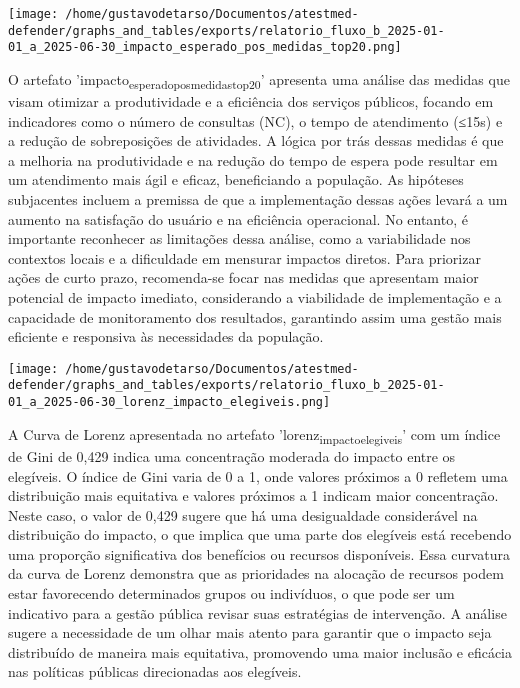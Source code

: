 \documentclass[11pt]{article}
\begin{document}
\begin{center}
\texttt{[image: /home/gustavodetarso/Documentos/atestmed-defender/graphs\_and\_tables/exports/relatorio\_fluxo\_b\_2025-01-01\_a\_2025-06-30\_impacto\_esperado\_pos\_medidas\_top20.png]}
\end{center}
O artefato 'impacto\textsubscript{esperado}\textsubscript{pos}\textsubscript{medidas}\textsubscript{top20}' apresenta uma análise das medidas que visam otimizar a produtividade e a eficiência dos serviços públicos, focando em indicadores como o número de consultas (NC), o tempo de atendimento (≤15s) e a redução de sobreposições de atividades. A lógica por trás dessas medidas é que a melhoria na produtividade e na redução do tempo de espera pode resultar em um atendimento mais ágil e eficaz, beneficiando a população. As hipóteses subjacentes incluem a premissa de que a implementação dessas ações levará a um aumento na satisfação do usuário e na eficiência operacional. No entanto, é importante reconhecer as limitações dessa análise, como a variabilidade nos contextos locais e a dificuldade em mensurar impactos diretos. Para priorizar ações de curto prazo, recomenda-se focar nas medidas que apresentam maior potencial de impacto imediato, considerando a viabilidade de implementação e a capacidade de monitoramento dos resultados, garantindo assim uma gestão mais eficiente e responsiva às necessidades da população.
\begin{center}
\texttt{[image: /home/gustavodetarso/Documentos/atestmed-defender/graphs\_and\_tables/exports/relatorio\_fluxo\_b\_2025-01-01\_a\_2025-06-30\_lorenz\_impacto\_elegiveis.png]}
\end{center}
A Curva de Lorenz apresentada no artefato 'lorenz\textsubscript{impacto}\textsubscript{elegiveis}' com um índice de Gini de 0,429 indica uma concentração moderada do impacto entre os elegíveis. O índice de Gini varia de 0 a 1, onde valores próximos a 0 refletem uma distribuição mais equitativa e valores próximos a 1 indicam maior concentração. Neste caso, o valor de 0,429 sugere que há uma desigualdade considerável na distribuição do impacto, o que implica que uma parte dos elegíveis está recebendo uma proporção significativa dos benefícios ou recursos disponíveis. Essa curvatura da curva de Lorenz demonstra que as prioridades na alocação de recursos podem estar favorecendo determinados grupos ou indivíduos, o que pode ser um indicativo para a gestão pública revisar suas estratégias de intervenção. A análise sugere a necessidade de um olhar mais atento para garantir que o impacto seja distribuído de maneira mais equitativa, promovendo uma maior inclusão e eficácia nas políticas públicas direcionadas aos elegíveis.
\end{document}

